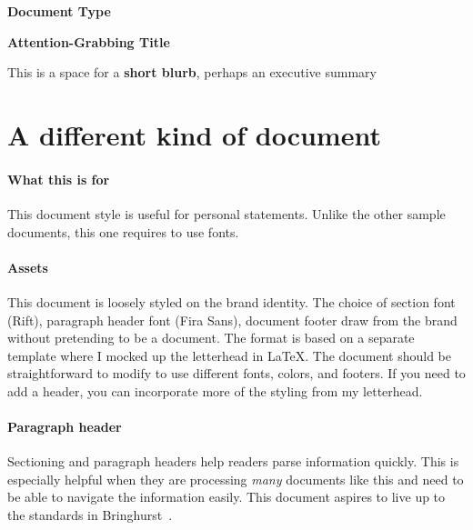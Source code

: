 \documentclass[12pt]{article}
\begin{document}
\newcommand{\FlipTR}{Document identification} 
\thispagestyle{firststylenice} %



\begin{center}
    {\color{UCRnavy} 
    \Helvetica \Large \textbf{Document Type} \par}
    {%
    \UCRriftsec
    \huge \textbf{Attention-Grabbing Title} \par}
    \vskip 1.5cm
\end{center}



{
    \noindent \Helvetica \small
    This is a space for a \textbf{short blurb}, perhaps an executive summary
}
\vskip 1cm

\section{A different kind of document}

\paragraph{What this is for}
This document style is useful for personal statements. Unlike the other sample documents, this one requires \XeLaTeX{} to use fonts.

\paragraph{Assets}
This document is loosely styled on the  brand identity. The choice of section font (Rift), paragraph header font (Fira Sans), document footer draw from the  brand without pretending to be a  document. The format is based on a separate template where I mocked up the  letterhead in \LaTeX. The document should be straightforward to modify to use different fonts, colors, and footers. If you need to add a header, you can incorporate more of the styling from my letterhead. 

\paragraph{Paragraph header} 
Sectioning and paragraph headers help readers parse information quickly. This is especially helpful when they are processing \emph{many} documents like this and need to be able to navigate the information easily. This document aspires to live up to the standards in Bringhurst~\cite{bringhurst2012elements}.




 	

% 


\end{document}
